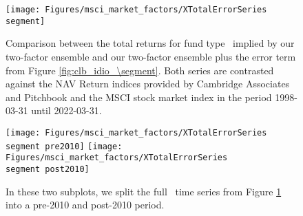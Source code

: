 \begin{figure}[H]
	\centering
	\texttt{[image: Figures/msci\_market\_factors/XTotalErrorSeries\\segment]}
	\caption{
		Comparison between the total returns for fund type \segment \ implied by our two-factor ensemble and our two-factor ensemble plus the error term from Figure \ref{fig:clb_idio_\segment}.
		Both series are contrasted against the NAV Return indices provided by Cambridge Associates and Pitchbook and the MSCI stock market index in the period 1998-03-31 until 2022-03-31.
	}
	\label{fig:clb_total_\segment}
\end{figure}

\begin{figure}[H]
	\centering
	\texttt{[image: Figures/msci\_market\_factors/XTotalErrorSeries\\segment pre2010]}
	\texttt{[image: Figures/msci\_market\_factors/XTotalErrorSeries\\segment post2010]}
	\caption{
		In these two subplots, we split the full \segment \ time series from Figure \ref{fig:clb_total_\segment} into a pre-2010 and post-2010 period.
	}
	\label{fig:clb_pre_post_2010_\segment}
\end{figure}

